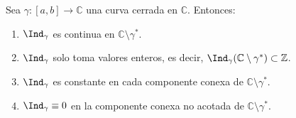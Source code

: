 \begin{proposición}
    Sea $\gamma : [a,b] \to \mathbb{C}$ una curva cerrada en $\mathbb{C}$. Entonces:
    \begin{enumerate}
        \item $\Ind_\gamma$ es continua en $\mathbb{C} \setminus \gamma^*$.
        \item $\Ind_\gamma$ solo toma valores enteros, es decir, $\Ind_\gamma (\mathbb{C} \setminus \gamma^*) \subset \mathbb{Z}$.
        \item $\Ind_\gamma$ es constante en cada componente conexa de $\mathbb{C} \setminus \gamma^*$.
        \item $\Ind_\gamma \equiv 0$ en la componente conexa no acotada de $\mathbb{C} \setminus \gamma^*$.
    \end{enumerate}
\end{proposición}

